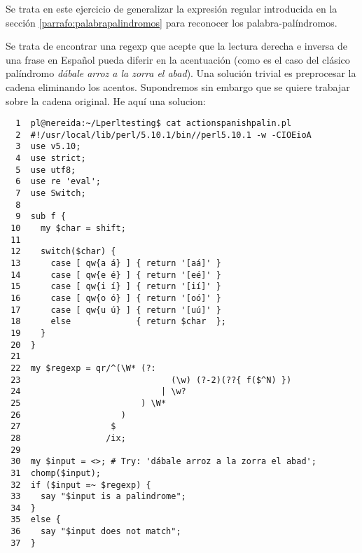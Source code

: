 Se trata en este ejercicio de generalizar la expresión
regular introducida en la sección
\ref{parrafo:palabrapalindromos}
para reconocer los palabra-palíndromos. 

Se trata de encontrar una regexp que acepte
que la lectura derecha e inversa de una frase en Español
pueda diferir en la acentuación (como es el caso
del clásico palíndromo {\it dábale arroz a la zorra 
el abad}). Una solución trivial es preprocesar 
la cadena eliminando los acentos. Supondremos sin embargo
que se quiere trabajar sobre la cadena original.
He aquí una solucion:
 

\begin{latexonly}
\begin{verbatim}
  1  pl@nereida:~/Lperltesting$ cat actionspanishpalin.pl 
  2  #!/usr/local/lib/perl/5.10.1/bin//perl5.10.1 -w -CIOEioA
  3  use v5.10;
  4  use strict;
  5  use utf8;
  6  use re 'eval';
  7  use Switch;
  8  
  9  sub f {
 10    my $char = shift;
 11  
 12    switch($char) {
 13      case [ qw{a á} ] { return '[aá]' }
 14      case [ qw{e é} ] { return '[eé]' }
 15      case [ qw{i í} ] { return '[ií]' }
 16      case [ qw{o ó} ] { return '[oó]' }
 17      case [ qw{u ú} ] { return '[uú]' }
 18      else             { return $char  };
 19    }
 20  }
 21  
 22  my $regexp = qr/^(\W* (?: 
 23                              (\w) (?-2)(??{ f($^N) })
 24                            | \w? 
 25                        ) \W*
 26                    )
 27                  $
 28                 /ix;
 29  
 30  my $input = <>; # Try: 'dábale arroz a la zorra el abad';
 31  chomp($input);
 32  if ($input =~ $regexp) {
 33    say "$input is a palindrome";
 34  }
 35  else {
 36    say "$input does not match";
 37  }
\end{verbatim}
\end{latexonly}
